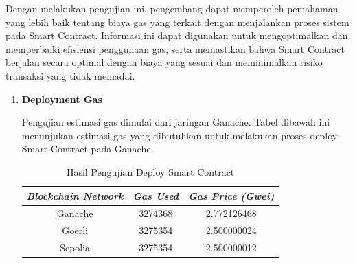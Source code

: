 Dengan melakukan pengujian ini, pengembang dapat memperoleh pemahaman yang lebih baik tentang biaya gas yang terkait dengan menjalankan proses sistem pada Smart Contract. Informasi ini dapat digunakan untuk mengoptimalkan dan memperbaiki efisiensi penggunaan gas, serta memastikan bahwa Smart Contract berjalan secara optimal dengan biaya yang sesuai dan meminimalkan risiko transaksi yang tidak memadai.

\begin{enumerate}
  \item
        \textbf{Deployment Gas}

        Pengujian estimasi gas dimulai dari jaringan Ganache. Tabel dibawah ini menunjukan estimasi gas yang dibutuhkan untuk melakukan proses deploy Smart Contract pada Ganache

        \begin{longtable}{|c|c|c|}
          \caption{Hasil Pengujian Deploy Smart Contract}
          \label{tb:UjiDeploy}                                                                             \\
          \hline
          \rowcolor[HTML]{C0C0C0}
          \textbf{\emph{Blockchain Network}} & \textbf{\emph{Gas Used}} & \textbf{\emph{Gas Price (Gwei)}} \\
          \hline
          Ganache                            & 3274368                  & 2.772126468                      \\
          Goerli                             & 3275354                  & 2.500000024                      \\
          Sepolia                            & 3275354                  & 2.500000012                      \\
          \hline
        \end{longtable}


\end{enumerate}
